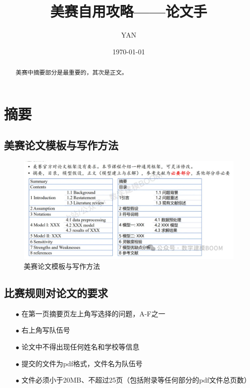 \documentclass[]{article}
\begin{document}
	
	\title{美赛自用攻略——论文手}
	\author{YAN}
	\maketitle
	\date{\today}
	
	\begin{abstract}
		
		美赛中摘要部分是最重要的，其次是正文。
		
	\end{abstract}
	
	\section{摘要}
		\subsection{美赛论文模板与写作方法}
			\begin{figure}[htbp]
				\centering
				\includegraphics[width=1\textwidth]{1}
				\caption{美赛论文模板与写作方法}
				\label{fig:1}
			\end{figure}
		\subsection{比赛规则对论文的要求}
			\begin{itemize}
				\item[$\bullet$] 在第一页摘要页左上角写选择的问题，A-F之一
				\item[$\bullet$] 右上角写队伍号
				\item[$\bullet$] 论文中不得出现任何姓名和学校等信息
				\item[$\bullet$] 提交的文件为pdf格式，文件名为队伍号
				\item[$\bullet$] 文件必须小于20MB、不超过25页（包括附录等任何部分的pdf文件总页数）
			\end{itemize}
\end{document}
